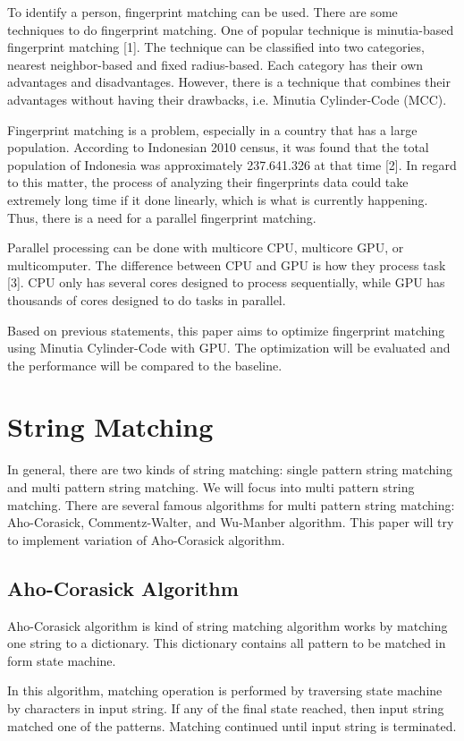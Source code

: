 \documentclass[conference]{IEEEtran}
\begin{document}
To identify a person, fingerprint matching can be used. There are some techniques to do fingerprint matching. One of popular technique is minutia-based fingerprint matching [1]. The technique can be classified into two categories, nearest neighbor-based and fixed radius-based. Each category has their own advantages and disadvantages. However, there is a technique that combines their advantages without having their drawbacks, i.e. Minutia Cylinder-Code (MCC). 

Fingerprint matching is a problem, especially in a country that has a large population. According to Indonesian 2010 census, it was found that the total population of Indonesia was approximately 237.641.326 at that time [2]. In regard to this matter, the process of analyzing their fingerprints data could take extremely long time if it done linearly, which is what is currently happening. Thus, there is a need for a parallel fingerprint matching.

Parallel processing can be done with multicore CPU, multicore GPU, or multicomputer. The difference between CPU and GPU is how they process task [3]. CPU only has several cores designed to process sequentially, while GPU has thousands of cores designed to do tasks in parallel.

Based on previous statements, this paper aims to optimize fingerprint matching using Minutia Cylinder-Code with GPU. The optimization will be evaluated and the performance will be compared to the baseline.

\section{String Matching}
In general, there are two kinds of string matching: single pattern string matching and multi pattern string matching. We will focus into multi pattern string matching. There are several famous algorithms for multi pattern string matching: Aho-Corasick, Commentz-Walter, and Wu-Manber algorithm. This paper will try to implement variation of Aho-Corasick algorithm.

    \subsection{Aho-Corasick Algorithm}
    Aho-Corasick algorithm is kind of string matching algorithm works by matching one string to a dictionary. This dictionary contains all pattern to be matched in form state machine. 
    
    In this algorithm, matching operation is performed by traversing state machine by characters in input string. If any of the final state reached, then input string matched one of the patterns. Matching continued until input string is terminated. 
\end{document}
